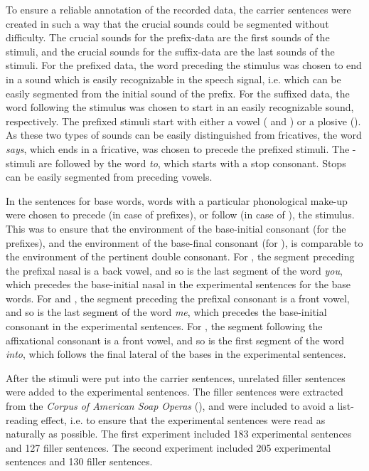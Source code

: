 To ensure a reliable annotation of the recorded data, the carrier sentences were created in such a way that the crucial sounds could be segmented without difficulty. The crucial sounds for the prefix-data are the first sounds of the stimuli, and the crucial sounds for the suffix-data are the last sounds of the stimuli. 
For the prefixed data, the word preceding the stimulus was chosen to end in a sound which is easily recognizable in the speech signal, i.e. which can be easily segmented from the initial sound of the prefix. For the suffixed data, the word following the stimulus was chosen to start in an easily recognizable sound, respectively. 
The prefixed stimuli start with either a vowel ( and ) or a plosive (). As these two types of sounds can be easily distinguished from fricatives,   the word \textit{says}, which ends in a fricative, was chosen to precede the prefixed stimuli. 
The -stimuli are followed by the word \textit{to}, which starts with a stop consonant. Stops can be easily segmented from preceding vowels.  


In the sentences for base words, words with a particular phonological make-up were chosen to precede (in case of prefixes), or follow (in case of ), the stimulus. This was to ensure that the environment of the base-initial consonant (for the prefixes), and the environment of the base-final consonant (for ), is comparable to the environment of the pertinent double consonant.
For , the segment preceding the prefixal nasal is a back vowel, and so is the last segment of the word \textit{you}, which precedes the base-initial nasal in the experimental sentences for the base words. 
For  and , the segment preceding the prefixal consonant is a front vowel, and so is the last segment of the word \textit{me}, which precedes the base-initial consonant in the experimental sentences. 
For , the segment following the affixational consonant is a front vowel, and so is the first segment of the word \textit{into}, which follows the final lateral of the bases in the experimental sentences. 




After the stimuli were put into the carrier sentences, unrelated filler sentences were added to the experimental sentences. The filler sentences were extracted from the \textit{Corpus of American Soap Operas} (\citealt{Davies.2011}), and were included  to avoid a list-reading effect, i.e. to ensure that the experimental sentences were read as naturally as possible. The first experiment included 183 experimental sentences and 127 filler sentences. The second experiment included 205 experimental sentences and 130 filler sentences. 

